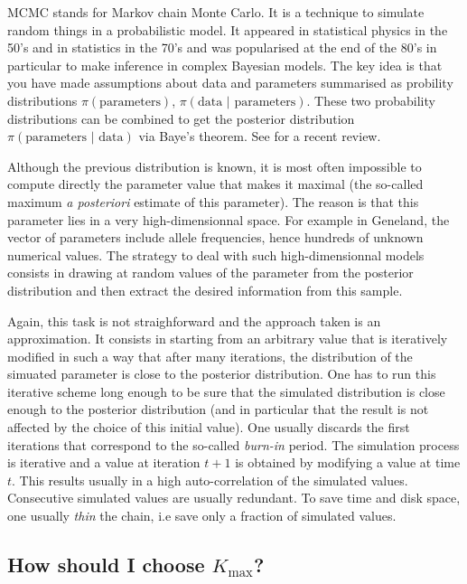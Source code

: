 \documentclass[a4paper,10pt]{article}
\begin{document}
MCMC stands for Markov chain Monte Carlo. It is a technique to simulate random things in a probabilistic model. 
It appeared in statistical physics 
in the 50's and in statistics in the 70's and was popularised at the end of the 80's in particular to make 
inference in complex Bayesian models. 
The key idea is that you have made assumptions about data and parameters summarised as probility distributions 
$\pi(\mbox{parameters})$,  $\pi(\mbox{data $|$ parameters})$. 
These two probability distributions can be combined to get the posterior distribution 
$\pi(\mbox{parameters $|$ data})$ via Baye's theorem. See \cite{Beaumont04} for a recent review. 


Although the previous distribution is known, it is most often impossible to compute directly the parameter value that 
makes it maximal (the so-called maximum {\em a posteriori} estimate of this parameter). The reason is that this parameter lies in a very high-dimensionnal 
space. For example in {\sc Geneland}, the vector of parameters  include allele frequencies, hence hundreds of unknown numerical values. 
The strategy to deal with such high-dimensionnal models consists in drawing at random values of the parameter from the posterior distribution 
and then extract the desired information from this sample. 

Again, this task is  not straighforward and the approach taken is an approximation. 
It consists in starting from an arbitrary value that is iteratively modified in such a way that after many iterations, 
the distribution of the 
simuated parameter is close to the posterior  distribution.  
One has to run this iterative scheme long enough to be sure that the simulated distribution is 
close enough to the posterior distribution (and in particular that the result is not  
affected by the choice of this initial value).
One usually discards the first iterations that correspond to the so-called {\em burn-in} period. 
The simulation process is iterative and a value at iteration $t+1$ is obtained by modifying a value at time $t$. This results usually in a 
high auto-correlation of the simulated values. Consecutive simulated values are usually redundant. To save time and disk space, 
one usually {\em thin} the chain, i.e save only  a fraction of simulated values. 



\subsection{How should I choose $K_{\max}$?}\label{sec:faqKmax}
\end{document}
